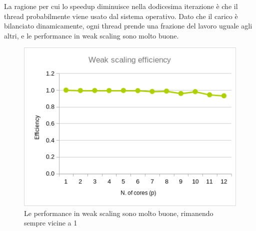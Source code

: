 \documentclass[a4paper,11pt, twoside]{report}
\begin{document}
La ragione per cui lo speedup diminuisce nella dodicesima iterazione è che il thread probabilmente viene usato dal sistema operativo.
Dato che il carico è bilanciato dinamicamente, ogni thread prende una frazione del lavoro uguale agli altri,
e le performance in weak scaling sono molto buone.
\begin{figure}[H]
    \includegraphics[scale=0.5]{images/omp_weak.png}
    \caption[]{Le performance in weak scaling sono molto buone, rimanendo sempre vicine a 1}
\end{figure}
\end{document}
